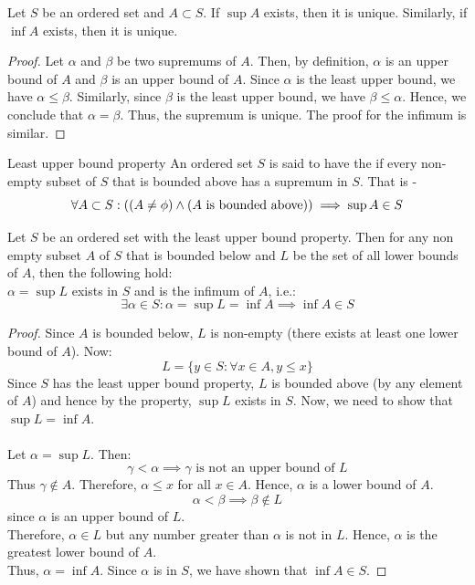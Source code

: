 \documentclass[openany]{book}
\begin{document}
\begin{mytheorem}
    Let $S$ be an ordered set and $A \subset S$. If $\sup A$ exists, then it is unique. Similarly, if $\inf A$ exists, then it is unique.
\end{mytheorem}
\begin{proof}
    Let $\alpha$ and $\beta$ be two supremums of $A$. Then, by definition, $\alpha$ is an upper bound of $A$ and $\beta$ is an upper bound of $A$. Since $\alpha$ is the least upper bound, we have $\alpha \leq \beta$. Similarly, since $\beta$ is the least upper bound, we have $\beta \leq \alpha$. Hence, we conclude that $\alpha = \beta$. Thus, the supremum is unique. The proof for the infimum is similar.
\end{proof}
\begin{mydefinition}{Least upper bound property}
    An ordered set $S$ is said to have the  if every non-empty subset of $S$ that is bounded above has a supremum in $S$. That is - 
    $$\forall A \subset S: ((A \neq \phi) \wedge (A \text{ is bounded above})) \implies \sup A \in S$$
\end{mydefinition}
\begin{mytheorem}
    Let $S$ be an ordered set with the least upper bound property. Then for any non empty subset $A$ of $S$ that is bounded below and $L$ be the set of all lower bounds of $A$, then the following hold: \\ 
    $\alpha = \sup L$ exists in $S$ and is the infimum of $A$, i.e.: 
    $$\exists \alpha \in S: \alpha = \sup L = \inf A \implies \inf A \in S$$
\end{mytheorem}
\begin{proof}
    Since $A$ is bounded below, $L$ is non-empty (there exists at least one lower bound of $A$). Now: 
    $$L = \{y\in S: \forall x \in A, y \leq x\}$$
    Since $S$ has the least upper bound property, $L$ is bounded above (by any element of $A$) and hence by the property, $\sup L$ exists in $S$. Now, we need to show that $\sup L = \inf A$. \\ \\ 
    Let $\alpha = \sup L$. Then: 
    $$\gamma < \alpha \implies \gamma \text{ is not an upper bound of } L$$
    Thus $\gamma \notin A$. Therefore, $\alpha \leq x$ for all $x \in A$. Hence, $\alpha$ is a lower bound of $A$. \\
    $$\alpha < \beta \implies \beta \notin L$$ since $\alpha$ is an upper bound of $L$. \\
    Therefore, $\alpha \in L$ but any number greater than $\alpha$ is not in $L$. Hence, $\alpha$ is the greatest lower bound of $A$. \\
    Thus, $\alpha = \inf A$. Since $\alpha$ is in $S$, we have shown that $\inf A \in S$.
\end{proof}
\end{document}
